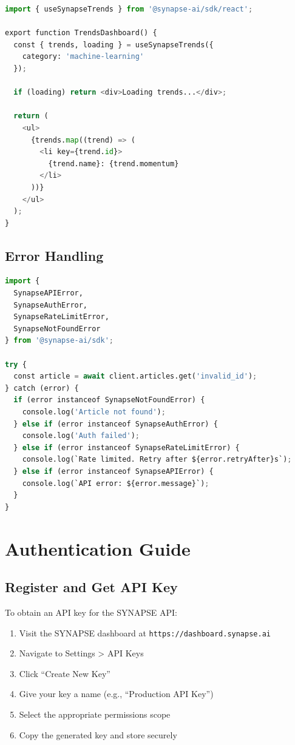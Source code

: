 \documentclass{report}
\begin{document}
\begin{lstlisting}[language=Python]
import { useSynapseTrends } from '@synapse-ai/sdk/react';

export function TrendsDashboard() {
  const { trends, loading } = useSynapseTrends({
    category: 'machine-learning'
  });

  if (loading) return <div>Loading trends...</div>;

  return (
    <ul>
      {trends.map((trend) => (
        <li key={trend.id}>
          {trend.name}: {trend.momentum}
        </li>
      ))}
    </ul>
  );
}
\end{lstlisting}

\section{Error Handling}

\begin{lstlisting}[language=Python]
import {
  SynapseAPIError,
  SynapseAuthError,
  SynapseRateLimitError,
  SynapseNotFoundError
} from '@synapse-ai/sdk';

try {
  const article = await client.articles.get('invalid_id');
} catch (error) {
  if (error instanceof SynapseNotFoundError) {
    console.log('Article not found');
  } else if (error instanceof SynapseAuthError) {
    console.log('Auth failed');
  } else if (error instanceof SynapseRateLimitError) {
    console.log(`Rate limited. Retry after ${error.retryAfter}s`);
  } else if (error instanceof SynapseAPIError) {
    console.log(`API error: ${error.message}`);
  }
}
\end{lstlisting}

\chapter{Authentication Guide}

\section{Register and Get API Key}

To obtain an API key for the SYNAPSE API:

\begin{enumerate}
    \item Visit the SYNAPSE dashboard at \texttt{https://dashboard.synapse.ai}
    \item Navigate to Settings \textgreater{} API Keys
    \item Click \textquotedblleft Create New Key\textquotedblright
    \item Give your key a name (e.g., \textquotedblleft Production API Key\textquotedblright)
    \item Select the appropriate permissions scope
    \item Copy the generated key and store securely
\end{enumerate}
\end{document}
